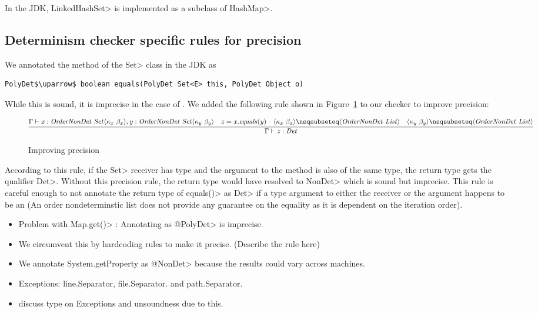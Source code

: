 In the JDK, \<LinkedHashSet> is implemented as a subclass of \<HashMap>.

\subsection{Determinism checker specific rules for precision}\label{precision}
We annotated the  method of the \<Set> class in the JDK as
\begin{verbatim}
PolyDet$\uparrow$ boolean equals(PolyDet Set<E> this, PolyDet Object o)
\end{verbatim}
While this is sound, it is imprecise in the case of . We added the following rule shown in Figure~\ref{fig-precision-rules} to our checker to improve precision:

\begin{figure}
    $\infer{\Gamma \vdash \mathit{z : Det}}{\Gamma \vdash \mathit{x} : \mathit{OrderNonDet} \ \mathit{Set}\langle \kappa_{x} \ \beta_{x}\rangle, \mathit{y} : \mathit{OrderNonDet} \ \mathit{Set}\langle \kappa_{y} \ \beta_{y}\rangle & \mathit{z = x.equals(y)} & \langle \kappa_{x} \ \beta_{x}\rangle \nsqsubseteq \langle \mathit{OrderNonDet \ List} \rangle & \langle \kappa_{y} \ \beta_{y}\rangle \nsqsubseteq \langle \mathit{OrderNonDet \ List} \rangle }$
    
    \caption{Improving precision}
    \label{fig-precision-rules}
\end{figure}
According to this rule, if the \<Set> receiver has type  and the argument to the  method is
also of the same type, the return type gets the qualifier \<Det>. Without this precision rule, the return type would have resolved to \<NonDet> which
is sound but imprecise. This rule is careful enough to not annotate the return type of \<equals()> as \<Det> if a type argument to either the
receiver or the argument happens to be an  (An order nondeterminstic list does not provide any guarantee on the
equality as it is dependent on the iteration order). 

\begin{itemize}
    \item Problem with \<Map.get()> : Annotating as \<@PolyDet> is imprecise.
    \item We circumvent this by hardcoding rules to make it precise. (Describe the rule here)
    
    \item We annotate System.getProperty as \<@NonDet> because the results could vary across machines.
    \item Exceptions: line.Separator, file.Separator. and path.Separator.
    \item discuss type on Exceptions and unsoundness due to this.
\end{itemize}

